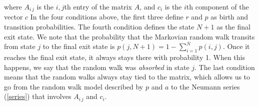 \documentclass{elsart}
\theoremstyle{remark}
\theoremstyle{definition}
\theoremstyle{proof}
\begin{document}
        where $A_{i\,j}$ is the $i,j$th entry of the matrix $A$, and $c_i$
        is the $i$th component of the vector $c$ In the four conditions above,
        the first three define $r$ and $p$ as birth and transition
        probabilities.  The fourth condition defines the state $N+1$ as
        the final exit state.  We note that the probability that the
        Markovian random walk transits from state $j$ to the final exit
        state is $p(j,N+1) = 1 - \sum_{i=1}^N p(i,j)$.  Once it reaches
        the final exit state, it always stays there with probability 1.
        When this happens, we say that the random walk was \emph{absorbed}
        in state $j$.  The last condition means that the random walks always
        stay tied to the matrix, which allows us to go from the random walk
        model described by $p$ and $a$ to the Neumann series (\ref{series})
        that involves $A_{i\,j}$ and $c_i$.
        
\end{document}
